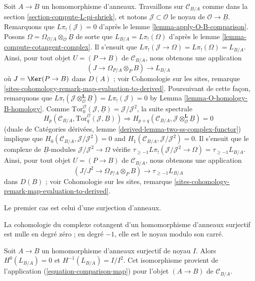 \begin{remark}
\label{remark-make-map}
Soit $A \to B$ un homomorphisme d'anneaux. Travaillons sur
$\mathcal{C}_{B/A}$ comme dans la section
\ref{section-compute-L-pi-shriek}, et notons
$\mathcal{J} \subset \mathcal{O}$ le noyau de
$\mathcal{O} \to \underline{B}$. Remarquons que
$L\pi_!(\mathcal{J}) = 0$ d'après le lemme
\ref{lemma-apply-O-B-comparison}. Posons
$\Omega =  \Omega_{\mathcal{O}/A} \otimes_\mathcal{O} \underline{B}$
de sorte que
$L_{B/A} = L\pi_!(\Omega)$ d'après le lemme
\ref{lemma-compute-cotangent-complex}. Il s'ensuit que
$L\pi_!(\mathcal{J} \to \Omega) = L\pi_!(\Omega) = L_{B/A}$. Ainsi, pour tout
objet $U = (P \to B)$ de $\mathcal{C}_{B/A}$, nous obtenons une application
\begin{equation}
\label{equation-comparison-map-A}
(J \to \Omega_{P/A} \otimes_P B) \longrightarrow L_{B/A}
\end{equation}
où $J = \Ker(P \to B)$ dans $D(A)$ ; voir Cohomologie sur les sites, remarque
\ref{sites-cohomology-remark-map-evaluation-to-derived}. Poursuivant de cette
façon, remarquons que
$L\pi_!(\mathcal{J} \otimes_\mathcal{O}^\mathbf{L} \underline{B}) =
L\pi_!(\mathcal{J}) = 0$ by
Lemma \ref{lemma-O-homology-B-homology}.
Comme $\text{Tor}_0^\mathcal{O}(\mathcal{J}, \underline{B}) =
\mathcal{J}/\mathcal{J}^2$, la suite spectrale
$$
H_p(\mathcal{C}_{B/A}, \text{Tor}_q^\mathcal{O}(\mathcal{J}, \underline{B}))
\Rightarrow 
H_{p + q}(\mathcal{C}_{B/A},
\mathcal{J} \otimes_\mathcal{O}^\mathbf{L} \underline{B}) = 0
$$
(duale de Catégories dérivées, lemme
\ref{derived-lemma-two-ss-complex-functor}) implique que
$H_0(\mathcal{C}_{B/A}, \mathcal{J}/\mathcal{J}^2) = 0$
and $H_1(\mathcal{C}_{B/A}, \mathcal{J}/\mathcal{J}^2) = 0$.
Il s'ensuit que le complexe de $\underline{B}$-modules
$\mathcal{J}/\mathcal{J}^2 \to \Omega$ vérifie
$\tau_{\geq -1}L\pi_!(\mathcal{J}/\mathcal{J}^2 \to \Omega) =
\tau_{\geq -1}L_{B/A}$.
Ainsi, pour tout objet $U = (P \to B)$ de $\mathcal{C}_{B/A}$, nous obtenons
une application
\begin{equation}
\label{equation-comparison-map}
(J/J^2 \to \Omega_{P/A} \otimes_P B) \longrightarrow \tau_{\geq -1}L_{B/A}
\end{equation}
dans $D(B)$ ; voir Cohomologie sur les sites, remarque
\ref{sites-cohomology-remark-map-evaluation-to-derived}.
\end{remark}

\noindent
Le premier cas est celui d'une surjection d'anneaux.

\begin{lemma}
\label{lemma-surjection}
\begin{slogan}
La cohomologie du complexe cotangent d'un homomorphisme d'anneaux surjectif est
nulle en degré zéro ; en degré $-1$, elle est le noyau modulo son carré.
\end{slogan}
Soit $A \to B$ un homomorphisme d'anneaux surjectif de noyau $I$. Alors
$H^0(L_{B/A}) = 0$ et $H^{-1}(L_{B/A}) = I/I^2$. Cet isomorphisme provient de
l'application (\ref{equation-comparison-map}) pour l'objet $(A \to B)$ de
$\mathcal{C}_{B/A}$.
\end{lemma}

